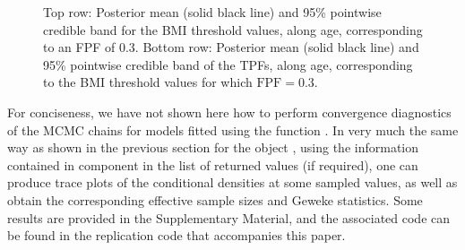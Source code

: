 \begin{figure}[ht!]
\begin{center}
\end{center}
\caption{Top row: Posterior mean (solid black line) and 95\% pointwise credible band for the BMI threshold values, along age, corresponding to an FPF of 0.3. Bottom row: Posterior mean (solid black line) and 95\% pointwise credible band of the TPFs, along age, corresponding to the BMI threshold values for which $\text{FPF}=0.3$.}
\label{cROC_bnp_th}
\end{figure}

For conciseness, we have not shown here how to perform convergence diagnostics of the MCMC chains for models fitted using the function . In very much the same way as shown in the previous section for the object , using the information contained in component  in the list of returned values (if required), one can produce trace plots of the conditional densities at some sampled values, as well as obtain the corresponding effective sample sizes and Geweke statistics. Some results are provided in the Supplementary Material, and the associated code can be found in the replication code that accompanies this paper.

